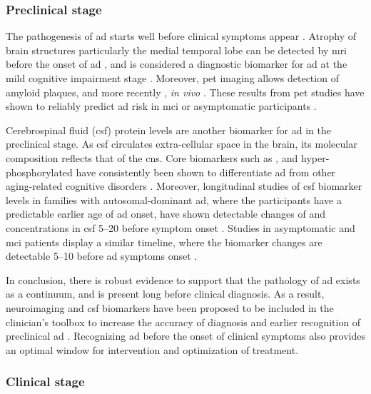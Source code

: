 \subsubsection{Preclinical stage}

The pathogenesis of \gls{ad} starts well before clinical symptoms appear \citep{dubois16}. Atrophy of brain structures particularly the medial temporal lobe can be detected by \gls{mri} before the onset of \gls{ad} \citep{jack92, scheltens92, chetelat03}, and is considered a diagnostic biomarker for \gls{ad} at the mild cognitive impairment stage \citep{jack99}. Moreover, \gls{pet} imaging allows detection of amyloid plaques, and more recently \atau{}, \textit{in vivo} \citep{mathis03, maruyama13, okamura13}. These results from \gls{pet} studies have shown to reliably predict \gls{ad} risk in \gls{mci} or asymptomatic participants \citep{klunk04, chien14, sepulcre16}.

Cerebrospinal fluid (\gls{csf}) protein levels are another biomarker for \gls{ad} in the preclinical stage. As \gls{csf} circulates extra-cellular space in the brain, its molecular composition reflects that of the \gls{cns}. Core biomarkers such as \abeta{}, \atau{} and hyper-phosphorylated \atau{} have consistently been shown to differentiate \gls{ad} from other aging-related cognitive disorders \citep{blennow10}. Moreover, longitudinal studies of \gls{csf} biomarker levels in families with autosomal-dominant \gls{ad}, where the participants have a predictable earlier age of \gls{ad} onset, have shown detectable changes of \abeta{} and \atau{} concentrations in \gls{csf} \SIrange{5}{20}{\year} before symptom onset \citep{bateman12, fagan14}. Studies in asymptomatic and \gls{mci} patients display a similar timeline, where the biomarker changes are detectable \SIrange{5}{10}{\year} before \gls{ad} symptoms onset \citep{buchhave12, vos13}. 

In conclusion, there is robust evidence to support that the pathology of \gls{ad} exists as a continuum, and is present long before clinical diagnosis. As a result, neuroimaging and \gls{csf} biomarkers have been proposed to be included in the clinician's toolbox to increase the accuracy of diagnosis and earlier recognition of preclinical \gls{ad} \citep{ad16}. Recognizing \gls{ad} before the onset of clinical symptoms also provides an optimal window for intervention and optimization of treatment. 


\subsubsection{Clinical stage}

